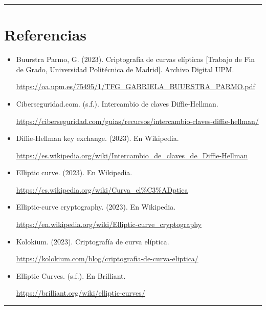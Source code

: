 \documentclass{article}
\begin{document}
{\color{black}\rule{\textwidth}{1.5pt}}

\section*{Referencias}

\begin{itemize}

    \item Buurstra Parmo, G. (2023). Criptografía de curvas elípticas [Trabajo de Fin de Grado, Universidad Politécnica de Madrid]. Archivo Digital UPM. 

    \url{https://oa.upm.es/75495/1/TFG_GABRIELA_BUURSTRA_PARMO.pdf}

    \item Ciberseguridad.com. (s.f.). Intercambio de claves Diffie-Hellman.

    \url{https://ciberseguridad.com/guias/recursos/intercambio-claves-diffie-hellman/}

    \item  Diffie-Hellman key exchange. (2023). En Wikipedia.

    \url{https://es.wikipedia.org/wiki/Intercambio_de_claves_de_Diffie-Hellman}

    \item  Elliptic curve. (2023). En Wikipedia. 

    \url{https://es.wikipedia.org/wiki/Curva_el%C3%ADptica}

    \item  Elliptic-curve cryptography. (2023). En Wikipedia.

    \url{https://en.wikipedia.org/wiki/Elliptic-curve_cryptography}

    \item  Kolokium. (2023). Criptografía de curva elíptica.

    \url{https://kolokium.com/blog/criptografia-de-curva-eliptica/}

    \item  Elliptic Curves. (s.f.). En Brilliant.

    \url{https://brilliant.org/wiki/elliptic-curves/}
    
\end{itemize}

{\color{black}\rule{\textwidth}{1.5pt}}
\end{document}
